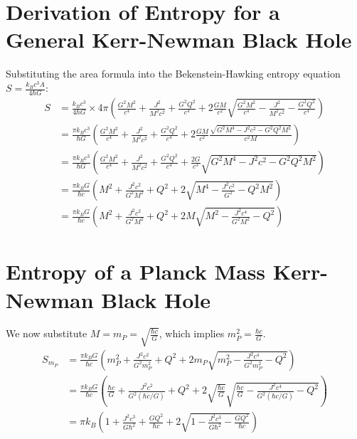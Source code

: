 \documentclass{article}
\begin{document}
	\section{Derivation of Entropy for a General Kerr-Newman Black Hole}
	
	Substituting the area formula into the Bekenstein-Hawking entropy equation $S = \frac{k_B c^3 A}{4 \hbar G}$:
	\begin{align*}
		S &= \frac{k_B c^3}{4 \hbar G} \times 4 \pi \left( \frac{G^2 M^2}{c^4} + \frac{J^2}{M^2 c^2} + \frac{G^2 Q^2}{c^4} + 2 \frac{G M}{c^2} \sqrt{\frac{G^2 M^2}{c^4} - \frac{J^2}{M^2 c^2} - \frac{G^2 Q^2}{c^4}} \right) \\
		&= \frac{\pi k_B c^3}{\hbar G} \left( \frac{G^2 M^2}{c^4} + \frac{J^2}{M^2 c^2} + \frac{G^2 Q^2}{c^4} + 2 \frac{G M}{c^2} \frac{\sqrt{G^2 M^4 - J^2 c^2 - G^2 Q^2 M^2}}{c^2 M} \right) \\
		&= \frac{\pi k_B c^3}{\hbar G} \left( \frac{G^2 M^2}{c^4} + \frac{J^2}{M^2 c^2} + \frac{G^2 Q^2}{c^4} + \frac{2 G}{c^3} \sqrt{G^2 M^4 - J^2 c^2 - G^2 Q^2 M^2} \right) \\
		&= \frac{\pi k_B G}{\hbar c} \left( M^2 + \frac{J^2 c^2}{G^2 M^2} + Q^2 + 2 \sqrt{M^4 - \frac{J^2 c^2}{G^2} - Q^2 M^2} \right) \\
		&= \frac{\pi k_B G}{\hbar c} \left( M^2 + \frac{J^2 c^2}{G^2 M^2} + Q^2 + 2 M \sqrt{M^2 - \frac{J^2 c^4}{G^2 M^2} - Q^2} \right)
	\end{align*}
	
	\section{Entropy of a Planck Mass Kerr-Newman Black Hole}
	
	We now substitute $M = m_P = \sqrt{\frac{\hbar c}{G}}$, which implies $m_P^2 = \frac{\hbar c}{G}$.
	\begin{align*}
		S_{m_P} &= \frac{\pi k_B G}{\hbar c} \left( m_P^2 + \frac{J^2 c^2}{G^2 m_P^2} + Q^2 + 2 m_P \sqrt{m_P^2 - \frac{J^2 c^4}{G^2 m_P^2} - Q^2} \right) \\
		&= \frac{\pi k_B G}{\hbar c} \left( \frac{\hbar c}{G} + \frac{J^2 c^2}{G^2 (\hbar c / G)} + Q^2 + 2 \sqrt{\frac{\hbar c}{G}} \sqrt{\frac{\hbar c}{G} - \frac{J^2 c^4}{G^2 (\hbar c / G)} - Q^2} \right) \\
		&= \pi k_B \left( 1 + \frac{J^2 c^3}{G \hbar^2} + \frac{G Q^2}{\hbar c} + 2 \sqrt{1 - \frac{J^2 c^3}{G \hbar^2} - \frac{G Q^2}{\hbar c}} \right)
	\end{align*}
	
\end{document}
